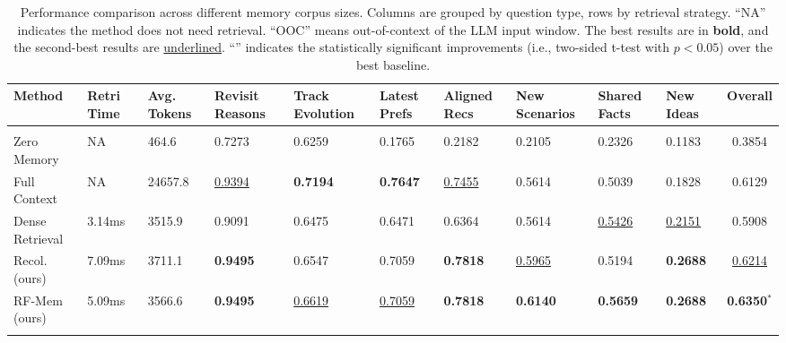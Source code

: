 \vspace{-15pt}
\begin{table}[ht]
\centering
\small
\caption{Performance comparison  across different memory corpus sizes. Columns are grouped by question type, rows by retrieval strategy. ``NA'' indicates the method does not need retrieval. ``OOC'' means out-of-context of the LLM input window. The best results are in \textbf{bold}, and the second-best results are \underline{underlined}. ``\textbf{{\large *}}'' indicates the statistically significant improvements (i.e., two-sided t-test with $p<0.05$) over the best baseline. 
}
\label{tab:personamem-alt}
\setlength{\tabcolsep}{1pt}
\renewcommand{\arraystretch}{0.9}
    \begin{tabular}{p{2.0cm}|M{1.0cm}|M{1.15cm}|M{1.2cm}M{1.4cm}M{0.9cm}M{1.2cm}M{1.3cm}M{1.0cm}M{1.0cm}|>{}c}
    \toprule
     \textbf{Method} & \textbf{Retri Time}& \textbf{Avg. Tokens}&\textbf{Revisit Reasons} & \textbf{Track Evolution} & \textbf{Latest Prefs} & \textbf{Aligned Recs} & \textbf{New Scenarios}& \textbf{Shared Facts} & \textbf{New Ideas} & \textbf{Overall}  \\
    \midrule
     \\
    Zero Memory & NA &464.6 & 0.7273 &0.6259& 0.1765& 0.2182& 0.2105& 0.2326& 0.1183& 0.3854 \\
    Full Context & NA &24657.8 & \underline{0.9394}&\textbf{0.7194}&\textbf{0.7647} &\underline{0.7455} &0.5614 &0.5039 &0.1828 &0.6129 \\
    Dense Retrieval & 3.14ms&3515.9 & 0.9091 & 0.6475 & 0.6471 & 0.6364 & 0.5614 & \underline{0.5426} & \underline{0.2151} & 0.5908 \\
    Recol. (ours) & 7.09ms &3711.1& \textbf{0.9495} & 0.6547 &0.7059 & \textbf{0.7818} & \underline{0.5965} & 0.5194 & \textbf{0.2688} & \underline{0.6214}\\
    RF-Mem  (ours)& 5.09ms& 3566.6& \textbf{0.9495} & \underline{0.6619} & \underline{0.7059} & \textbf{0.7818} & \textbf{0.6140} & \textbf{0.5659} & \textbf{0.2688} & \textbf{0.6350$^*$} \\
    \midrule
     \\

\end{tabular}
\end{table}
